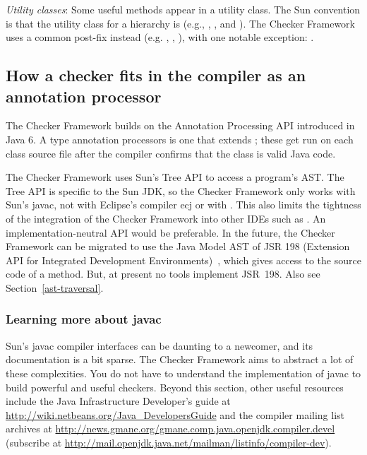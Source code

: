 \emph{Utility classes}:
Some useful methods appear in a utility class.  The Sun convention is that
the utility class for a  hierarchy is  (e.g.,
, , and
).  The Checker Framework uses a common
 post-fix instead (e.g. ,
, ), with one
notable exception: .


\subsection{How a checker fits in the compiler as an annotation processor}

The Checker Framework builds on the Annotation Processing API
introduced in Java 6.  A type annotation processors is one that extends
; these get run on each class
source file after the compiler confirms that the class is valid Java code.

The Checker Framework uses Sun's Tree API to access a program's AST\@.
The Tree API is specific to the Sun JDK, so the Checker Framework only
works with Sun's javac, not with Eclipse's compiler ecj or with
.  This also limits the tightness of
the integration of the Checker Framework into other IDEs such as \@.
An implementation-neutral API would be preferable.
In the future, the Checker Framework
can be migrated to use the Java Model AST of JSR 198 (Extension API for
Integrated Development Environments)~\cite{JSR198}, which gives access to
the source code of a method.  But, at present no tools
implement JSR~198.  Also see Section~\ref{ast-traversal}.



\subsubsection{Learning more about javac}

Sun's javac compiler interfaces can be daunting to a
newcomer, and its documentation is a bit sparse. The Checker Framework
aims to abstract a lot of these complexities.
You do not have to understand the implementation of javac to
build powerful and useful checkers.
Beyond this section, 
other useful resources include the Java Infrastructure
Developer's guide at
\url{http://wiki.netbeans.org/Java_DevelopersGuide} and the compiler
mailing list archives at
\url{http://news.gmane.org/gmane.comp.java.openjdk.compiler.devel}
(subscribe at
\url{http://mail.openjdk.java.net/mailman/listinfo/compiler-dev}).



